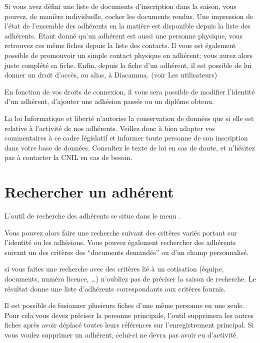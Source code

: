 \documentclass[a4paper,10pt,oneside,french]{sphinxmanual}
\begin{document}
Si vous avez défini une liste de documents d’inscription dans la saison, vous pouvez, de manière individuelle, cocher les documents rendus. Une impression de l’état de l’ensemble des adhérents en la matière est disponible depuis la liste des adhérents.
Etant donné qu’un adhérent est aussi une personne physique, vous retrouvez ces même fiches depuis la liste des contacts. Il vous est également possible de promouvoir un simple contact physique en adhérent; vous aurez alors juste complété sa fiche.
Enfin, depuis la fiche d’un adhérent, il est possible de lui donner un droit d’accès, ou alias, à Diacamma. (voir Les utilisateurs)

En fonction de vos droits de connexion, il vous sera possible de modifier l’identité d’un adhérent, d’ajouter une adhésion passée ou un diplôme obtenu.

\noindent{}

 La loi Informatique et liberté n’autorise la conservation de données que si elle est relative à l’activité de nos adhérents. Veillez donc à bien adapter vos commentaires à ce cadre législatif et informer toute personne de son inscription dans votre base de données.
Consultez le texte de loi en cas de doute, et n’hésitez pas à contacter la CNIL en cas de besoin.


\section{Rechercher un adhérent}
\label{\detokenize{member/member_search:rechercher-un-adherent}}\label{\detokenize{member/member_search::doc}}
L’outil de recherche des adhérents se situe dans le menu .

\noindent{}

Vous pouvez alors faire une recherche suivant des critères variés portant sur l’identité ou les adhésions.
Vous pouvez également rechercher des adhérents suivant un des critères des “documents demandés” ou d’un champ personnalisé.

 si vous faites une recherche avec des critères lié à un cotisation (équipe, documents, numéro licence, …) n’oubliez pas de préciser la saison de recherche.
Le résultat donne une liste d’adhérents correspondants aux critères fournis.

Il est possible de fusionner plusieurs fiches d’une même personne en une seule.
Pour cela vous devez préciser la personne principale, l’outil supprimera les autres fiches après avoir déplacé toutes leurs références sur l’enregistrement principal.
Si vous voulez supprimer un adhérent, celui-ci ne devra pas avoir eu d’activité.
\end{document}
